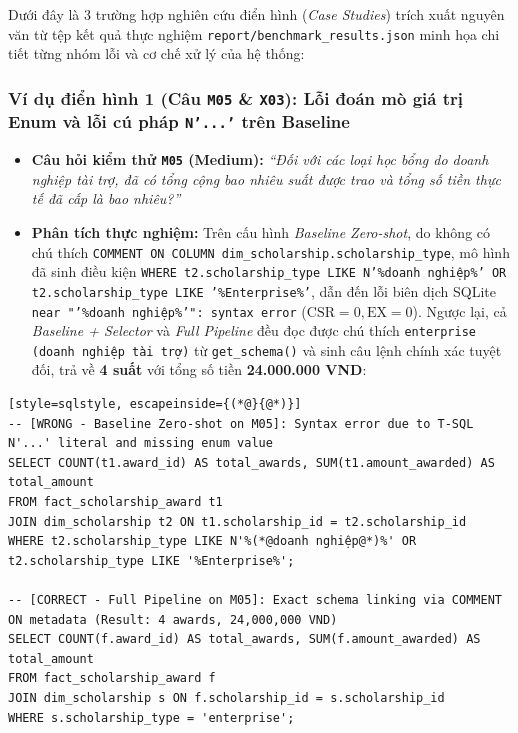 \documentclass[12pt,a4paper]{report}
\begin{document}
Dưới đây là 3 trường hợp nghiên cứu điển hình (\textit{Case Studies}) trích xuất nguyên văn từ tệp kết quả thực nghiệm \texttt{report/benchmark\_results.json} minh họa chi tiết từng nhóm lỗi và cơ chế xử lý của hệ thống:

\subsubsection{Ví dụ điển hình 1 (Câu \texttt{M05} \& \texttt{X03}): Lỗi đoán mò giá trị Enum và lỗi cú pháp \texttt{N'...'} trên Baseline}
\begin{itemize}
    \item \textbf{Câu hỏi kiểm thử \texttt{M05} (Medium):} \textit{``Đối với các loại học bổng do doanh nghiệp tài trợ, đã có tổng cộng bao nhiêu suất được trao và tổng số tiền thực tế đã cấp là bao nhiêu?''}
    \item \textbf{Phân tích thực nghiệm:} Trên cấu hình \textit{Baseline Zero-shot}, do không có chú thích \texttt{COMMENT ON COLUMN dim\_scholarship.scholarship\_type}, mô hình đã sinh điều kiện \texttt{WHERE t2.scholarship\_type LIKE N'\%doanh nghiệp\%' OR t2.scholarship\_type LIKE '\%Enterprise\%'}, dẫn đến lỗi biên dịch SQLite \texttt{near "'\%doanh nghiệp\%'": syntax error} ($\text{CSR} = 0, \text{EX} = 0$). Ngược lại, cả \textit{Baseline + Selector} và \textit{Full Pipeline} đều đọc được chú thích \texttt{enterprise (doanh nghiệp tài trợ)} từ \texttt{get\_schema()} và sinh câu lệnh chính xác tuyệt đối, trả về \textbf{4 suất} với tổng số tiền \textbf{24.000.000 VND}:
\end{itemize}
\begin{lstlisting}[style=sqlstyle, escapeinside={(*@}{@*)}]
-- [WRONG - Baseline Zero-shot on M05]: Syntax error due to T-SQL N'...' literal and missing enum value
SELECT COUNT(t1.award_id) AS total_awards, SUM(t1.amount_awarded) AS total_amount
FROM fact_scholarship_award t1
JOIN dim_scholarship t2 ON t1.scholarship_id = t2.scholarship_id
WHERE t2.scholarship_type LIKE N'%(*@doanh nghiệp@*)%' OR t2.scholarship_type LIKE '%Enterprise%';

-- [CORRECT - Full Pipeline on M05]: Exact schema linking via COMMENT ON metadata (Result: 4 awards, 24,000,000 VND)
SELECT COUNT(f.award_id) AS total_awards, SUM(f.amount_awarded) AS total_amount
FROM fact_scholarship_award f
JOIN dim_scholarship s ON f.scholarship_id = s.scholarship_id
WHERE s.scholarship_type = 'enterprise';
\end{lstlisting}
\end{document}
